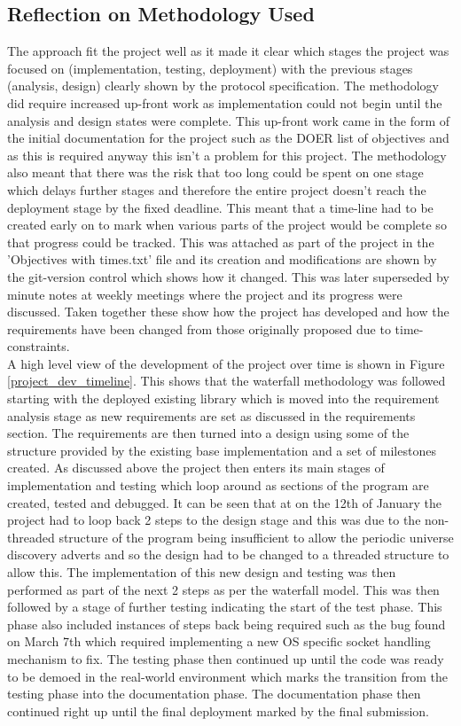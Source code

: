 \documentclass[11pt,a4paper]{article}
\begin{document}
\subsection{Reflection on Methodology Used}
The approach fit the project well as it made it clear which stages the project was focused on (implementation, testing, deployment) with the previous stages (analysis, design) clearly shown by the protocol specification. The methodology did require increased up-front work as implementation could not begin until the analysis and design states were complete. This up-front work came in the form of the initial documentation for the project such as the DOER list of objectives and as this is required anyway this isn't a problem for this project. The methodology also meant that there was the risk that too long could be spent on one stage which delays further stages and therefore the entire project doesn't reach the deployment stage by the fixed deadline. This meant that a time-line had to be created early on to mark when various parts of the project would be complete so that progress could be tracked. This was attached as part of the project in the 'Objectives with times.txt' file and its creation and modifications are shown by the git-version control which shows how it changed. This was later superseded by minute notes at weekly meetings where the project and its progress were discussed. Taken together these show how the project has developed and how the requirements have been changed from those originally proposed due to time-constraints. \\

A high level view of the development of the project over time is shown in Figure \ref{project_dev_timeline}. This shows that the waterfall methodology was followed starting with the deployed existing library which is moved into the requirement analysis stage as new requirements are set as discussed in the requirements section. The requirements are then turned into a design using some of the structure provided by the existing base implementation and a set of milestones created. As discussed above the project then enters its main stages of implementation and testing which loop around as sections of the program are created, tested and debugged. It can be seen that at on the 12th of January the project had to loop back 2 steps to the design stage and this was due to the non-threaded structure of the program being insufficient to allow the periodic universe discovery adverts and so the design had to be changed to a threaded structure to allow this. The implementation of this new design and testing was then performed as part of the next 2 steps as per the waterfall model. This was then followed by a stage of further testing indicating the start of the test phase. This phase also included instances of steps back being required such as the bug found on March 7th which required implementing a new OS specific socket handling mechanism to fix. The testing phase then continued up until the code was ready to be demoed in the real-world environment which marks the transition from the testing phase into the documentation phase. The documentation phase then continued right up until the final deployment marked by the final submission.\\
\end{document}
